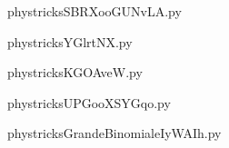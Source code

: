     

    \clearpage
    


    \newcommand{\CaptionFigSBRXooGUNvLA}{<+Type your caption here+>}
    \begin{center}
        
    \end{center}
    phystricksSBRXooGUNvLA.py

    

    \clearpage
    


    \newcommand{\CaptionFigYGlrtNX}{<+Type your caption here+>}
    \begin{center}
        
    \end{center}
    phystricksYGlrtNX.py

    

    \clearpage
    


    \newcommand{\CaptionFigKGOAveW}{<+Type your caption here+>}
    \begin{center}
        
    \end{center}
    phystricksKGOAveW.py

    

    \clearpage
    


    \newcommand{\CaptionFigUPGooXSYGqo}{<+Type your caption here+>}
    \begin{center}
        
    \end{center}
    phystricksUPGooXSYGqo.py

    

    \clearpage
    


    \newcommand{\CaptionFigGrandeBinomialeIyWAIh}{<+Type your caption here+>}
    \begin{center}
        
    \end{center}
    phystricksGrandeBinomialeIyWAIh.py

    

    \clearpage
    


